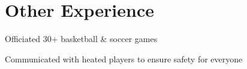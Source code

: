 \documentclass[]{deedy-resume-openfont}
\begin{document}
\begin{minipage}[t]{0.33\textwidth}


    \section {Other Experience}
    \begin{tightemize}
        \item Officiated 30+ basketball \& soccer games
        \item Communicated with heated players to ensure safety for everyone
    \end{tightemize}


\end{minipage}
\hfill
\end{document}
